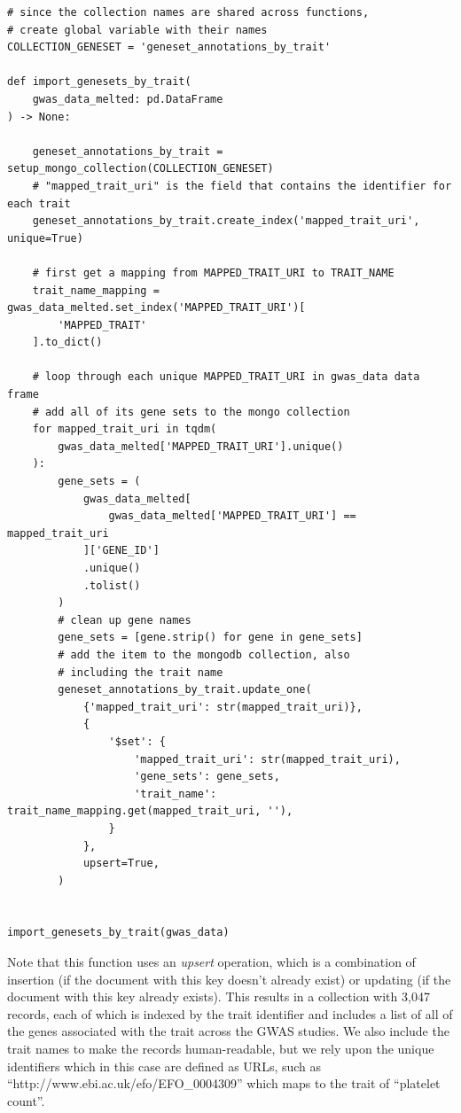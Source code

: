 \begin{lstlisting}[style=Python]
# since the collection names are shared across functions, 
# create global variable with their names
COLLECTION_GENESET = 'geneset_annotations_by_trait'

def import_genesets_by_trait(
    gwas_data_melted: pd.DataFrame
) -> None:

    geneset_annotations_by_trait = setup_mongo_collection(COLLECTION_GENESET)
    # "mapped_trait_uri" is the field that contains the identifier for each trait
    geneset_annotations_by_trait.create_index('mapped_trait_uri', unique=True)

    # first get a mapping from MAPPED_TRAIT_URI to TRAIT_NAME
    trait_name_mapping = gwas_data_melted.set_index('MAPPED_TRAIT_URI')[
        'MAPPED_TRAIT'
    ].to_dict()

    # loop through each unique MAPPED_TRAIT_URI in gwas_data data frame 
    # add all of its gene sets to the mongo collection 
    for mapped_trait_uri in tqdm(
        gwas_data_melted['MAPPED_TRAIT_URI'].unique()
    ):
        gene_sets = (
            gwas_data_melted[
                gwas_data_melted['MAPPED_TRAIT_URI'] == mapped_trait_uri
            ]['GENE_ID']
            .unique()
            .tolist()
        )
        # clean up gene names
        gene_sets = [gene.strip() for gene in gene_sets]
        # add the item to the mongodb collection, also
        # including the trait name
        geneset_annotations_by_trait.update_one(
            {'mapped_trait_uri': str(mapped_trait_uri)},
            {
                '$set': {
                    'mapped_trait_uri': str(mapped_trait_uri),
                    'gene_sets': gene_sets,
                    'trait_name': trait_name_mapping.get(mapped_trait_uri, ''),
                }
            },
            upsert=True,
        )


import_genesets_by_trait(gwas_data)
\end{lstlisting}

Note that this function uses an \textit{upsert} operation, which is a combination of insertion (if the document with this key doesn't already exist) or updating (if the document with this key already exists).  This results in a collection with 3,047 records, each of which is indexed by the trait identifier and includes a list of all of the genes associated with the trait across the GWAS studies.  We also include the trait names to make the records human-readable, but we rely upon the unique identifiers which in this case are defined as URLs, such as ``http://www.ebi.ac.uk/efo/EFO\_0004309'' which maps to the trait of ``platelet count''.

